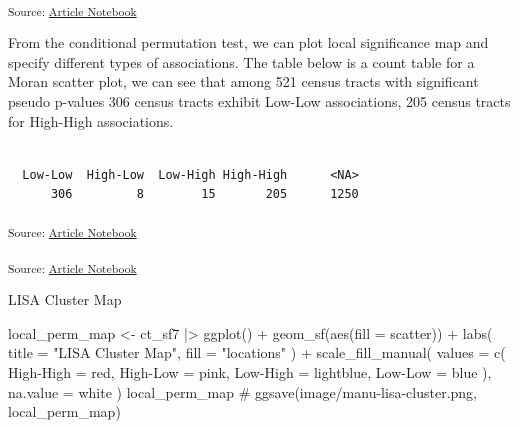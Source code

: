\documentclass[
  letterpaper,
  DIV=11,
  numbers=noendperiod]{scrartcl}
\newenvironment{Shaded}{\begin{snugshade}}{\end{snugshade}}
\newcommand{\AttributeTok}[1]{\textcolor[rgb]{0.40,0.45,0.13}{#1}}
\newcommand{\CommentTok}[1]{\textcolor[rgb]{0.37,0.37,0.37}{#1}}
\newcommand{\FunctionTok}[1]{\textcolor[rgb]{0.28,0.35,0.67}{#1}}
\newcommand{\NormalTok}[1]{\textcolor[rgb]{0.00,0.23,0.31}{#1}}
\newcommand{\OtherTok}[1]{\textcolor[rgb]{0.00,0.23,0.31}{#1}}
\newcommand{\SpecialCharTok}[1]{\textcolor[rgb]{0.37,0.37,0.37}{#1}}
\newcommand{\StringTok}[1]{\textcolor[rgb]{0.13,0.47,0.30}{#1}}
\begin{document}
\textsubscript{Source:
\href{https://h-christy.github.io/24-manuscript/index.qmd.html}{Article
Notebook}}

From the conditional permutation test, we can plot local significance
map and specify different types of associations. The table below is a
count table for a Moran scatter plot, we can see that among 521 census
tracts with significant pseudo p-values 306 census tracts exhibit
Low-Low associations, 205 census tracts for High-High associations.

\begin{verbatim}

  Low-Low  High-Low  Low-High High-High      <NA> 
      306         8        15       205      1250 
\end{verbatim}

\textsubscript{Source:
\href{https://h-christy.github.io/24-manuscript/index.qmd.html}{Article
Notebook}}

\textsubscript{Source:
\href{https://h-christy.github.io/24-manuscript/index.qmd.html}{Article
Notebook}}

LISA Cluster Map

\begin{Shaded}
\begin{Highlighting}[]
\NormalTok{local\_perm\_map }\OtherTok{\textless{}{-}}\NormalTok{ ct\_sf7 }\SpecialCharTok{|\textgreater{}} \FunctionTok{ggplot}\NormalTok{() }\SpecialCharTok{+}
\FunctionTok{geom\_sf}\NormalTok{(}\FunctionTok{aes}\NormalTok{(}\AttributeTok{fill =}\NormalTok{ scatter)) }\SpecialCharTok{+}
\FunctionTok{labs}\NormalTok{(}
  \AttributeTok{title =} \StringTok{"LISA Cluster Map"}\NormalTok{,}
  \AttributeTok{fill =} \StringTok{"locations"}
\NormalTok{) }\SpecialCharTok{+}
\FunctionTok{scale\_fill\_manual}\NormalTok{(}
  \AttributeTok{values =} \FunctionTok{c}\NormalTok{(}
    \StringTok{\textquotesingle{}High{-}High\textquotesingle{}} \OtherTok{=} \StringTok{\textquotesingle{}red\textquotesingle{}}\NormalTok{,}
    \StringTok{\textquotesingle{}High{-}Low\textquotesingle{}} \OtherTok{=} \StringTok{\textquotesingle{}pink\textquotesingle{}}\NormalTok{,}
    \StringTok{\textquotesingle{}Low{-}High\textquotesingle{}} \OtherTok{=} \StringTok{\textquotesingle{}lightblue\textquotesingle{}}\NormalTok{,}
    \StringTok{\textquotesingle{}Low{-}Low\textquotesingle{}} \OtherTok{=} \StringTok{\textquotesingle{}blue\textquotesingle{}}
\NormalTok{  ),}
  \AttributeTok{na.value =} \StringTok{\textquotesingle{}white\textquotesingle{}}
\NormalTok{)}
\NormalTok{local\_perm\_map}
\CommentTok{\# ggsave(\textquotesingle{}image/manu{-}lisa{-}cluster.png\textquotesingle{}, local\_perm\_map)}
\end{Highlighting}
\end{Shaded}
\end{document}
